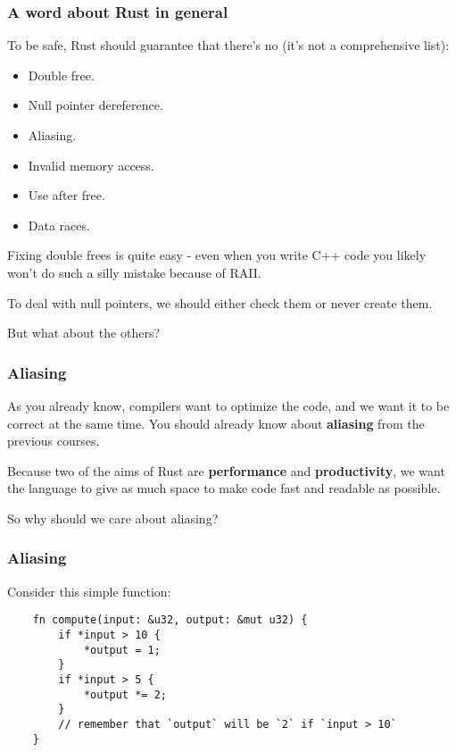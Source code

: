 \documentclass[aspectratio=1610,t]{beamer}
\begin{document}

\begin{frame}[fragile]
\frametitle{A word about Rust in general}
To be safe, Rust should guarantee that there's no (it's not a comprehensive list):

\begin{itemize}
    \item Double free.
    \item Null pointer dereference.
    \item Aliasing.
    \item Invalid memory access.
    \item Use after free.
    \item Data races.
\end{itemize}

Fixing double frees is quite easy - even when you write C++ code you likely won't do such a silly mistake because of RAII.

To deal with null pointers, we should either check them or never create them.

But what about the others?
\end{frame}


\begin{frame}[fragile]
\frametitle{Aliasing}
As you already know, compilers want to optimize the code, and we want it to be correct at the same time. You should already know about \textbf{aliasing} from the previous courses.

Because two of the aims of Rust are \textbf{performance} and \textbf{productivity}, we want the language to give as much space to make code fast and readable as possible.

So why should we care about aliasing?
\end{frame}


\begin{frame}[fragile]
\frametitle{Aliasing}
Consider this simple function:

\begin{verbatim}
    fn compute(input: &u32, output: &mut u32) {
        if *input > 10 {
            *output = 1;
        }
        if *input > 5 {
            *output *= 2;
        }
        // remember that `output` will be `2` if `input > 10`
    }
\end{verbatim}
\end{frame}
\end{document}
